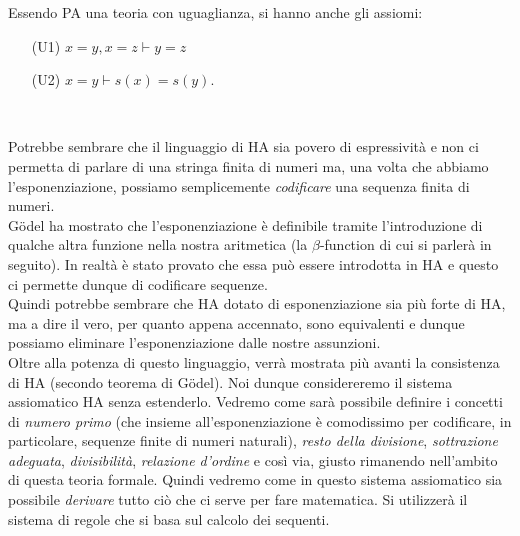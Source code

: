 \vspace{0.5 cm}
Essendo PA una teoria con uguaglianza, si hanno anche gli assiomi:
\begin{enumerate}
	\item[(U1)] $x=y,x=z\vdash y=z$
	\item[(U2)] $x=y\vdash s(x)=s(y). $
\end{enumerate}
\par\ \par

Potrebbe sembrare che il linguaggio di HA sia povero di espressivit\`a e non ci permetta di parlare di una stringa finita di numeri ma, una volta che abbiamo l'esponenziazione, possiamo semplicemente \textsl{codificare} una sequenza finita di numeri.\\ G\"odel ha mostrato che l'esponenziazione \`e definibile tramite l'introduzione di qualche altra funzione nella nostra aritmetica (la $\beta$-function di cui si parler\`a in seguito). In realt\`a \`e stato provato che essa pu\`o essere introdotta in HA e questo ci permette dunque di codificare sequenze.\\ Quindi potrebbe sembrare che HA dotato di esponenziazione sia pi\`u forte di HA, ma a dire il vero, per quanto appena accennato, sono equivalenti e dunque possiamo eliminare l'esponenziazione dalle nostre assunzioni.\\ Oltre alla potenza di questo linguaggio, verr\`a mostrata pi\`u avanti la consistenza di HA (secondo teorema di G\"odel).  Noi dunque considereremo il sistema assiomatico HA senza estenderlo. \newline
Vedremo come sar\`a possibile definire i concetti di \textsl{numero primo} (che insieme all'esponenziazione \`e comodissimo per codificare, in particolare, sequenze finite di numeri naturali), \textsl{resto della divisione}, \textsl{sottrazione adeguata}, \textsl{divisibilit\`a}, \textsl{relazione d'ordine} e cos\`i via, giusto rimanendo nell'ambito di questa teoria formale. Quindi vedremo come in questo sistema assiomatico sia possibile \textsl{derivare} tutto ci\`o che ci serve per fare matematica. \newline
Si utilizzer\`a il sistema di regole che si basa sul calcolo dei sequenti.

\vspace{0.3 cm}
